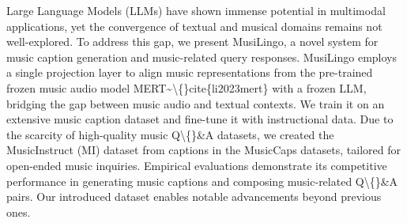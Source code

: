 Large Language Models (LLMs) have shown immense potential in multimodal applications, yet the convergence of textual and musical domains remains not well-explored. To address this gap, we present MusiLingo, a novel system for music caption generation and music-related query responses. MusiLingo employs a single projection layer to align music representations from the pre-trained frozen music audio model MERT\textasciitilde{}\textbackslash\{\}cite\{li2023mert\} with a frozen LLM, bridging the gap between music audio and textual contexts. We train it on an extensive music caption dataset and fine-tune it with instructional data. Due to the scarcity of high-quality music Q\textbackslash\{\}\&A datasets, we created the MusicInstruct (MI) dataset from captions in the MusicCaps datasets, tailored for open-ended music inquiries. Empirical evaluations demonstrate its competitive performance in generating music captions and composing music-related Q\textbackslash\{\}\&A pairs. Our introduced dataset enables notable advancements beyond previous ones.
